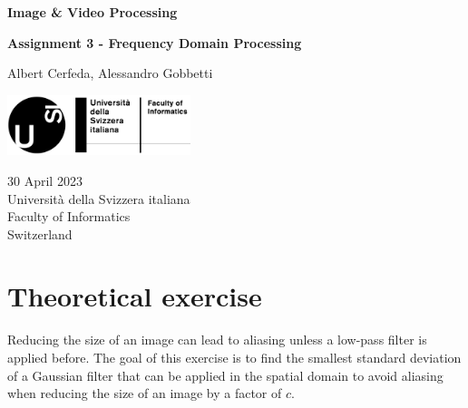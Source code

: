\documentclass[tikz,14pt,fleqn]{article}
\newcommand\namesurname{Albert Cerfeda, Alessandro Gobbetti}
\newcommand\assignment{Assignment 3 - Frequency Domain Processing}
\newcommand\subject{Image \& Video Processing}
\newcommand\documentdate{30 April 2023}
\begin{document}
\begin{titlepage}
   \begin{center}
       \vspace*{0.2cm}

       \textbf{\Large{\subject}}

       \vspace{0.5cm}
        \textbf{\assignment}\\[5mm]
        
            
       \vspace{0.4cm}

        \namesurname
        \begin{figure}[H]
            \centering
        \end{figure}
       \tableofcontents

       \vspace*{\fill}
     
        \includegraphics[width=0.4\textwidth]{fig/logo.png}
       
        \documentdate \\
        Università della Svizzera italiana\\
        Faculty of Informatics\\
        Switzerland\\

   \end{center}
\end{titlepage}





\section{Theoretical exercise} \label{sec:3}

Reducing the size of an image can lead to aliasing unless a low-pass filter is applied before.
The goal of this exercise is to find the smallest standard deviation of a Gaussian filter that can be applied in the spatial domain to avoid aliasing when reducing the size of an image by a factor of $c$.\\
\end{document}
